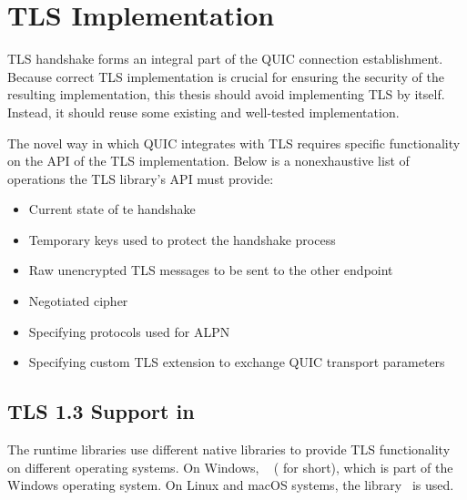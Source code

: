\section{TLS Implementation}

TLS handshake forms an integral part of the QUIC connection establishment. Because correct TLS
implementation is crucial for ensuring the security of the resulting implementation, this thesis
should avoid implementing TLS by itself. Instead, it should reuse some existing and well-tested
implementation.

The novel way in which QUIC integrates with TLS requires specific functionality on the API of the
TLS implementation. Below is a nonexhaustive list of operations the TLS library's API must provide:

\begin{itemize}

  \item Current state of te handshake

  \item Temporary keys used to protect the handshake process

  \item Raw unencrypted TLS messages to be sent to the other endpoint

  \item Negotiated cipher

  \item Specifying protocols used for ALPN

  \item Specifying custom TLS extension to exchange QUIC transport parameters

\end{itemize}

\subsection{TLS 1.3 Support in \dotnet{}}

The \dotnet{} runtime libraries use different native libraries to provide TLS functionality on
different operating systems. On Windows, ~\cite{Schannel} (\libschannel{}
for short), which is part of the Windows operating system. On Linux and macOS systems, the
\libopenssl{} library~\cite{OpenSSLWeb} is used.

